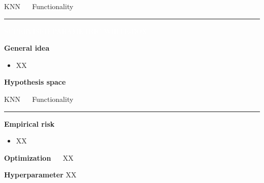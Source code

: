 \documentclass[11pt,compress,t,notes=noshow, xcolor=table]{beamer}
\begin{document}
\LARGE
\begin{frame}{\textcolor{gray!80}{KNN} ~~ Functionality}
\normalsize
\vspace{-0.5cm}
\noindent \textcolor{gray!80}{\rule{\textwidth}{1pt}}

\vspace{0.3cm}

\footnotesize

\colorbox{gray!80}{\textcolor{white}{SUPERVISED}}
\colorbox{gray!80}{\textcolor{white}{PARAMETRIC}}
\colorbox{gray!80}{\textcolor{white}{WHITE-BOX}}

\medskip

\textbf{\textcolor{gray!80}{General idea}} ~~
\begin{itemize}

\item XX

\end{itemize}

\medskip

\textbf{\textcolor{gray!80}{Hypothesis space}} ~~

\medskip
\centering

\end{frame}


\LARGE
\begin{frame}{\textcolor{gray!80}{KNN} ~~ Functionality}
\normalsize
\vspace{-0.5cm}
\noindent \textcolor{gray!80}{\rule{\textwidth}{1pt}}

\vspace{0.3cm}

\footnotesize

\textbf{\textcolor{gray!80}{Empirical risk}}

\begin{itemize}

\item XX
  
  
\end{itemize}


\medskip

\textbf{\textcolor{gray!80}{Optimization}} ~~
XX

\medskip

\textbf{\textcolor{gray!80}{Hyperparameter}} XX

\end{frame}
\end{document}
